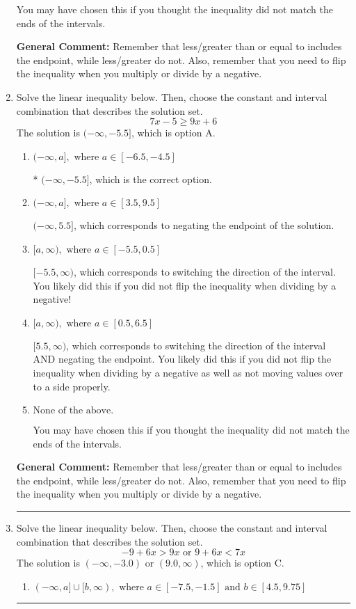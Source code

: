 \documentclass{extbook}[14pt]
\newcommand{\litem}[1]{\item #1

\rule{\textwidth}{0.4pt}}
\begin{document}
\begin{enumerate}
{\begin{enumerate}[label=\Alph*.]
You may have chosen this if you thought the inequality did not match the ends of the intervals.
\end{enumerate}

\textbf{General Comment:} Remember that less/greater than or equal to includes the endpoint, while less/greater do not. Also, remember that you need to flip the inequality when you multiply or divide by a negative.
}
\litem{
Solve the linear inequality below. Then, choose the constant and interval combination that describes the solution set.
\[ 7x -5 \geq 9x + 6 \]The solution is \( (-\infty, -5.5] \), which is option A.\begin{enumerate}[label=\Alph*.]
\item \( (-\infty, a], \text{ where } a \in [-6.5, -4.5] \)

* $(-\infty, -5.5]$, which is the correct option.
\item \( (-\infty, a], \text{ where } a \in [3.5, 9.5] \)

 $(-\infty, 5.5]$, which corresponds to negating the endpoint of the solution.
\item \( [a, \infty), \text{ where } a \in [-5.5, 0.5] \)

 $[-5.5, \infty)$, which corresponds to switching the direction of the interval. You likely did this if you did not flip the inequality when dividing by a negative!
\item \( [a, \infty), \text{ where } a \in [0.5, 6.5] \)

 $[5.5, \infty)$, which corresponds to switching the direction of the interval AND negating the endpoint. You likely did this if you did not flip the inequality when dividing by a negative as well as not moving values over to a side properly.
\item \( \text{None of the above}. \)

You may have chosen this if you thought the inequality did not match the ends of the intervals.
\end{enumerate}

\textbf{General Comment:} Remember that less/greater than or equal to includes the endpoint, while less/greater do not. Also, remember that you need to flip the inequality when you multiply or divide by a negative.
}
\litem{
Solve the linear inequality below. Then, choose the constant and interval combination that describes the solution set.
\[ -9 + 6 x > 9 x \text{ or } 9 + 6 x < 7 x \]The solution is \( (-\infty, -3.0) \text{ or } (9.0, \infty) \), which is option C.\begin{enumerate}[label=\Alph*.]
\item \( (-\infty, a] \cup [b, \infty), \text{ where } a \in [-7.5, -1.5] \text{ and } b \in [4.5, 9.75] \)


\end{enumerate}}
\end{enumerate}
\end{document}
